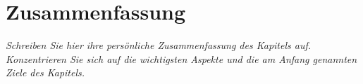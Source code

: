 \newpage
\section{Zusammenfassung}

\textit{Schreiben Sie hier ihre persönliche Zusammenfassung des Kapitels auf. Konzentrieren Sie sich auf die wichtigsten Aspekte und die am Anfang genannten Ziele des Kapitels.}

\vspace*{10cm}






\printbibliography[segment=\therefsegment,heading=subbibliography]
